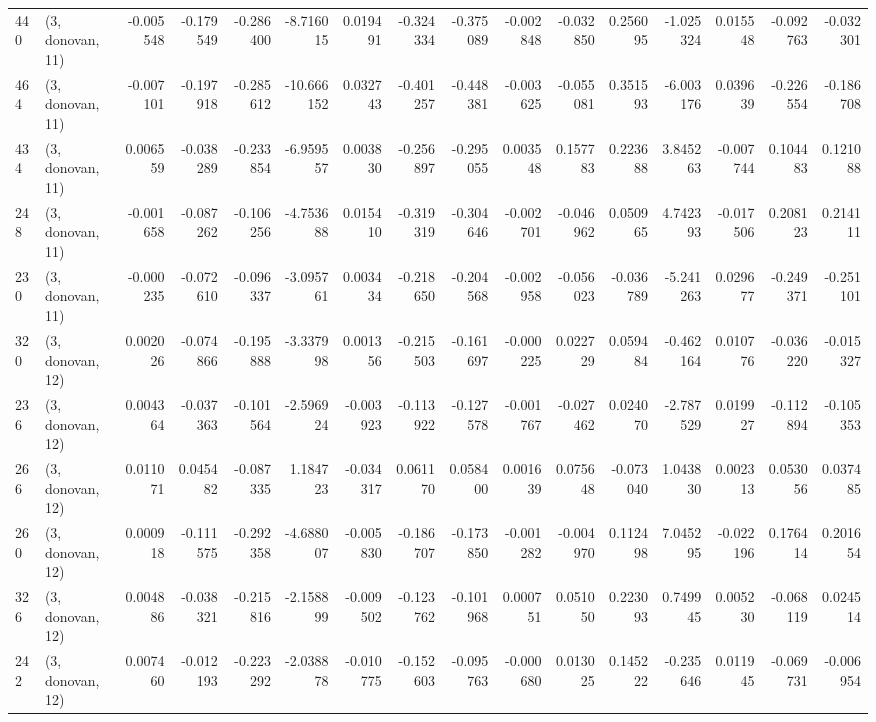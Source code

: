 \begin{tabular}{llrrrrrrrrrrrrrr}
440 &  (3, donovan, 11) &  -0.005548 & -0.179549 & -0.286400 &   -8.716015 &  0.019491 &  -0.324334 & -0.375089 & -0.002848 & -0.032850 &  0.256095 &   -1.025324 &  0.015548 & -0.092763 & -0.032301 \\
464 &  (3, donovan, 11) &  -0.007101 & -0.197918 & -0.285612 &  -10.666152 &  0.032743 &  -0.401257 & -0.448381 & -0.003625 & -0.055081 &  0.351593 &   -6.003176 &  0.039639 & -0.226554 & -0.186708 \\
434 &  (3, donovan, 11) &   0.006559 & -0.038289 & -0.233854 &   -6.959557 &  0.003830 &  -0.256897 & -0.295055 &  0.003548 &  0.157783 &  0.223688 &    3.845263 & -0.007744 &  0.104483 &  0.121088 \\
248 &  (3, donovan, 11) &  -0.001658 & -0.087262 & -0.106256 &   -4.753688 &  0.015410 &  -0.319319 & -0.304646 & -0.002701 & -0.046962 &  0.050965 &    4.742393 & -0.017506 &  0.208123 &  0.214111 \\
230 &  (3, donovan, 11) &  -0.000235 & -0.072610 & -0.096337 &   -3.095761 &  0.003434 &  -0.218650 & -0.204568 & -0.002958 & -0.056023 & -0.036789 &   -5.241263 &  0.029677 & -0.249371 & -0.251101 \\
320 &  (3, donovan, 12) &   0.002026 & -0.074866 & -0.195888 &   -3.337998 &  0.001356 &  -0.215503 & -0.161697 & -0.000225 &  0.022729 &  0.059484 &   -0.462164 &  0.010776 & -0.036220 & -0.015327 \\
236 &  (3, donovan, 12) &   0.004364 & -0.037363 & -0.101564 &   -2.596924 & -0.003923 &  -0.113922 & -0.127578 & -0.001767 & -0.027462 &  0.024070 &   -2.787529 &  0.019927 & -0.112894 & -0.105353 \\
266 &  (3, donovan, 12) &   0.011071 &  0.045482 & -0.087335 &    1.184723 & -0.034317 &   0.061170 &  0.058400 &  0.001639 &  0.075648 & -0.073040 &    1.043830 &  0.002313 &  0.053056 &  0.037485 \\
260 &  (3, donovan, 12) &   0.000918 & -0.111575 & -0.292358 &   -4.688007 & -0.005830 &  -0.186707 & -0.173850 & -0.001282 & -0.004970 &  0.112498 &    7.045295 & -0.022196 &  0.176414 &  0.201654 \\
326 &  (3, donovan, 12) &   0.004886 & -0.038321 & -0.215816 &   -2.158899 & -0.009502 &  -0.123762 & -0.101968 &  0.000751 &  0.051050 &  0.223093 &    0.749945 &  0.005230 & -0.068119 &  0.024514 \\
242 &  (3, donovan, 12) &   0.007460 & -0.012193 & -0.223292 &   -2.038878 & -0.010775 &  -0.152603 & -0.095763 & -0.000680 &  0.013025 &  0.145222 &   -0.235646 &  0.011945 & -0.069731 & -0.006954 \\

\end{tabular}
